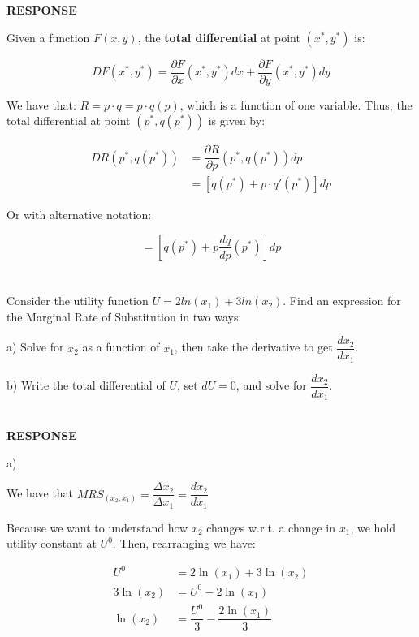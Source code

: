 \documentclass{article}
\begin{document}
\textbf{RESPONSE}

Given a function $F(x,y)$, the \textbf{total differential} at point $(x^*,y^*)$ is:

$$ DF(x^*,y^*) = \dfrac{\partial F}{\partial x} (x^*,y^*)dx + \dfrac{\partial F}{\partial y} (x^*,y^*)dy$$ 

We have that: $ R=p \cdot q = p \cdot q(p) $, which is a function of one variable. Thus, the total differential at point $(p^*,q(p^*))$ is given by: 

\begingroup
\addtolength{\jot}{1em} %
\begin{align*}
    DR(p^*,q(p^*)) &= \dfrac{\partial R}{\partial p} (p^*,q(p^*))dp  \\
     &= \left[q(p^*)+p\cdot q'(p^*)\right]dp
\end{align*}
\endgroup

Or with alternative notation:

$$  = \left[q(p^*)+p\dfrac{dq}{dp}(p^*)\right]dp$$ 


\pagebreak
\section{}
\colorbox{gray!30}{
\begin{minipage}{\textwidth}
Consider the utility function $U = 2 ln(x_1) + 3 ln(x_2)$. Find an expression for
the Marginal Rate of Substitution in two ways:

a) Solve for $x_2$ as a function of $x_1$, then take the derivative to get $\dfrac{dx_2}{dx_1}$.

b) Write the total differential of $U$, set $dU = 0$, and solve for  $\dfrac{dx_2}{dx_1}$.
\end{minipage}
} \\

\textbf{RESPONSE}

a)

We have that $ MRS_{(x_2,x_1)}= \dfrac{\Delta x_2}{ \Delta x_1}=\dfrac{dx_2}{dx_1} $

Because we want to understand how $x_2$ changes w.r.t. a change in $x_1$, we hold utility constant at $U^0$. Then, rearranging we have: 


\begingroup
\addtolength{\jot}{1em} %
\begin{align*}
    U^0 &= 2 \ln(x_1) + 3 \ln(x_2)\\
    3 \ln(x_2) &= U^0 - 2 \ln(x_1)\\
    \ln(x_2) &= \dfrac{U^0}{3}-\dfrac{2 \ln(x_1)}{3}
\end{align*}
\endgroup
\end{document}
